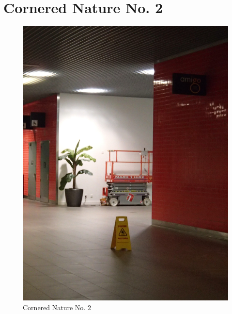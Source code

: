 \documentclass{book}
\begin{document}
\chapter{Cornered Nature No. 2}

\begin{figure}
\centering
\includegraphics[width=\textwidth,angle=-90]{figures/P1050158.JPG}
\caption{Cornered Nature No. 2}
\end{figure}
\end{document}

